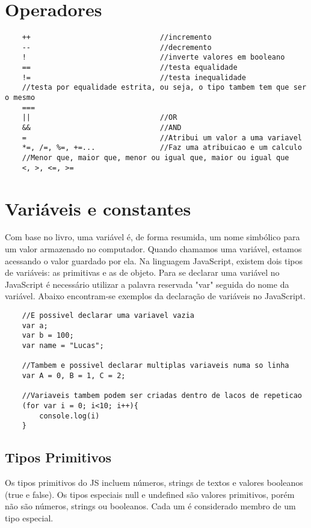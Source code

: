     \section{Operadores}
    \begin{lstlisting}
    ++								//incremento
    --								//decremento
    !								//inverte valores em booleano
    ==								//testa equalidade
    !=								//testa inequalidade
    //testa por equalidade estrita, ou seja, o tipo tambem tem que ser o mesmo
    ===	
    ||								//OR
    &&								//AND
    =								//Atribui um valor a uma variavel
    *=, /=, %=, +=...				//Faz uma atribuicao e um calculo
    //Menor que, maior que, menor ou igual que, maior ou igual que
    <, >, <=, >=
    \end{lstlisting}
    \section{Vari\'{a}veis e constantes}
    Com base no livro\cite{flanagan2020javascript}, uma variável é, de forma resumida, um nome simbólico para um valor armazenado no computador. Quando chamamos uma variável, estamos acessando o valor guardado por ela. \newline
    Na linguagem JavaScript, existem dois tipos de variáveis: as primitivas e as de objeto. 
    Para se declarar uma variável no JavaScript é necessário utilizar a palavra reservada "var" seguida do nome da variável. Abaixo encontram-se exemplos da declaração de variáveis no JavaScript.
    
    \begin{lstlisting}
    //E possivel declarar uma variavel vazia
    var a;
    var b = 100;
    var name = "Lucas";
    
    //Tambem e possivel declarar multiplas variaveis numa so linha
    var A = 0, B = 1, C = 2;
    
    //Variaveis tambem podem ser criadas dentro de lacos de repeticao
    (for var i = 0; i<10; i++){
    	console.log(i)
    }
    \end{lstlisting}
    
    \subsection{Tipos Primitivos}
    
	Os tipos primitivos do JS incluem números, strings de textos e valores booleanos (true e false).
	Os tipos especiais null e undefined são valores primitivos, porém não são números, strings ou booleanos. Cada um é considerado membro de um tipo especial.  

